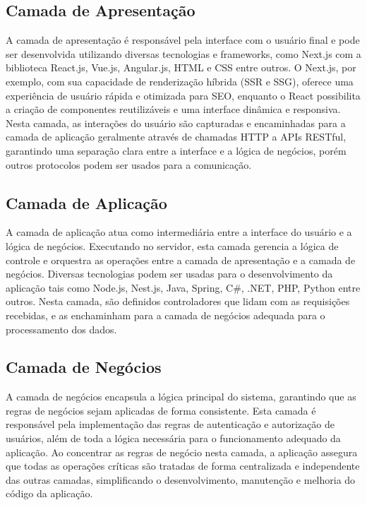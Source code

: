 \subsection{Camada de Apresentação}\label{subsec:camada_apresentacao}

A camada de apresentação é responsável pela interface com o usuário final e pode ser desenvolvida utilizando diversas tecnologias e frameworks, como Next.js com a biblioteca React.js, Vue.js, Angular.js, HTML e CSS entre outros. O Next.js, por exemplo, com sua capacidade de renderização híbrida (SSR e SSG), oferece uma experiência de usuário rápida e otimizada para SEO, enquanto o React possibilita a criação de componentes reutilizáveis e uma interface dinâmica e responsiva. Nesta camada, as interações do usuário são capturadas e encaminhadas para a camada de aplicação geralmente através de chamadas HTTP a APIs RESTful, garantindo uma separação clara entre a interface e a lógica de negócios, porém outros protocolos podem ser usados para a comunicação.

\subsection{Camada de Aplicação}

A camada de aplicação atua como intermediária entre a interface do usuário e a lógica de negócios. Executando no servidor, esta camada gerencia a lógica de controle e orquestra as operações entre a camada de apresentação e a camada de negócios. Diversas tecnologias podem ser usadas para o desenvolvimento da aplicação tais como Node.js, Nest.js, Java, Spring, C\#, .NET, PHP, Python entre outros. Nesta camada, são definidos controladores que lidam com as requisições recebidas, e as enchaminham para a camada de negócios adequada para o processamento dos dados.

\subsection{Camada de Negócios}

A camada de negócios encapsula a lógica principal do sistema, garantindo que as regras de negócios sejam aplicadas de forma consistente. Esta camada é responsável pela implementação das regras de autenticação e autorização de usuários, além de toda a lógica necessária para o funcionamento adequado da aplicação. Ao concentrar as regras de negócio nesta camada, a aplicação assegura que todas as operações críticas são tratadas de forma centralizada e independente das outras camadas, simplificando o desenvolvimento, manutenção e melhoria do código da aplicação.

